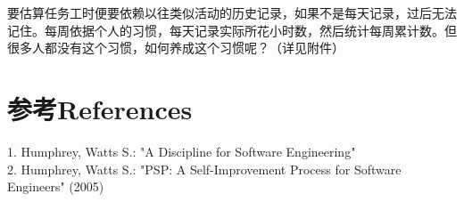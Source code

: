 要估算任务工时便要依赖以往类似活动的历史记录，如果不是每天记录，过后无法记住。每周依据个人的习惯，每天记录实际所花小时数，然后统计每周累计数。但很多人都没有这个习惯，如何养成这个习惯呢？（详见附件）\\

\hypertarget{ux53c2ux8003references}{%
\section{参考References}\label{ux53c2ux8003references}}

1. Humphrey, Watts S.: "A Discipline for Software Engineering"\\
2. Humphrey, Watts S.: "PSP: A Self-Improvement Process for Software
Engineers" (2005)\\

